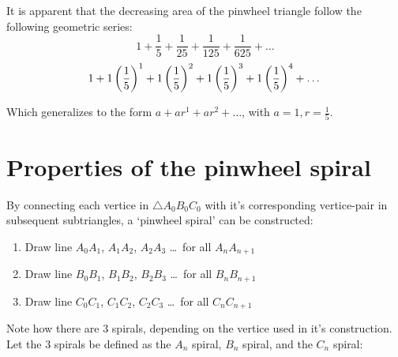 \noindent
It is apparent that the decreasing area of the pinwheel triangle follow the following geometric series:
\begin{equation}
    1 + \frac{1}{5} + \frac{1}{25} + \frac{1}{125} + \frac{1}{625} + \ldots
\end{equation}
\begin{equation}
    1 + 1\left(\frac{1}{5}\right)^1 + 1\left(\frac{1}{5}\right)^2 + 1\left(\frac{1}{5}\right)^3 + 1\left(\frac{1}{5}\right)^4 + \ldots \\
\end{equation}

\noindent
Which generalizes to the form $a + ar^1 + ar^2 + \ldots$, with $a = 1, r = \frac{1}{5}$.

\newpage
\section{Properties of the pinwheel spiral}
By connecting each vertice in $\triangle A_{0}B_{0}C_{0}$ with it's corresponding vertice-pair in subsequent subtriangles, a `pinwheel spiral' can be constructed:

\begin{enumerate}
    \item Draw line $A_{0}A_{1}$, $A_{1}A_{2}$, $A_{2}A_{3}$ \ldots\ for all $A_{n}A_{n + 1}$
    \item Draw line $B_{0}B_{1}$, $B_{1}B_{2}$, $B_{2}B_{3}$ \ldots\ for all $B_{n}B_{n + 1}$
    \item Draw line $C_{0}C_{1}$, $C_{1}C_{2}$, $C_{2}C_{3}$ \ldots\ for all $C_{n}C_{n + 1}$
\end{enumerate}



\noindent
Note how there are 3 spirals, depending on the vertice used in it's construction. Let the 3 spirals be defined as the $A_n$ spiral, $B_n$ spiral, and the $C_n$ spiral:






